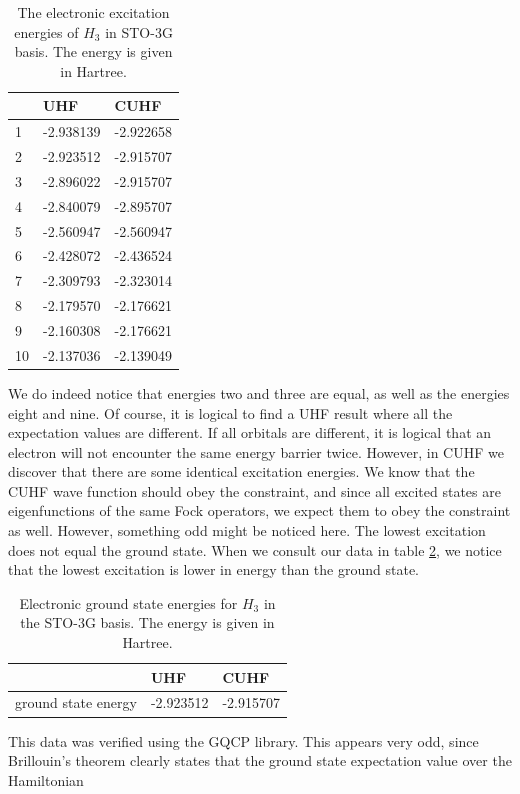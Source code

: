\documentclass[twoside,twocolumn,9pt]{article}
\begin{document}
\begin{table}[h]
  \caption{The electronic excitation energies of $H_3$ in STO-3G basis. The energy is given in Hartree.}
  \label{tab:excits}
  \begin{tabular}{l|l|l}
       & UHF       & CUHF      \\
    \hline
    1  & -2.938139 & -2.922658 \\
    2  & -2.923512 & -2.915707 \\
    3  & -2.896022 & -2.915707 \\
    4  & -2.840079 & -2.895707 \\
    5  & -2.560947 & -2.560947 \\
    6  & -2.428072 & -2.436524 \\
    7  & -2.309793 & -2.323014 \\
    8  & -2.179570 & -2.176621 \\
    9  & -2.160308 & -2.176621 \\
    10 & -2.137036 & -2.139049
  \end{tabular}
\end{table}
We do indeed notice that energies two and three are equal, as well as the energies eight and nine. Of course, it is logical to find a UHF result where all the expectation values are
different. If all orbitals are different, it is logical that an electron will not encounter the same energy barrier twice. However, in CUHF we discover that there are some identical
excitation energies. We know that the CUHF wave function should obey the constraint, and since all excited states are eigenfunctions of the same Fock operators, we expect them to
obey the constraint as well. However, something odd might be noticed here. The lowest excitation does not equal the ground state. When we consult our data in table
\ref{tab:ground states}, we notice that the lowest excitation is lower in energy than the ground state.
\begin{table}[h]
  \caption{Electronic ground state energies for $H_3$ in the STO-3G basis. The energy is given in Hartree.}
  \label{tab:ground states}
  \begin{tabular}{l|l|l}
                        & UHF       & CUHF      \\
    \hline
    ground state energy & -2.923512 & -2.915707
  \end{tabular}
\end{table}
This data was verified using the GQCP library. This appears very odd, since Brillouin's theorem clearly states that the ground state expectation value over the Hamiltonian
\end{document}
